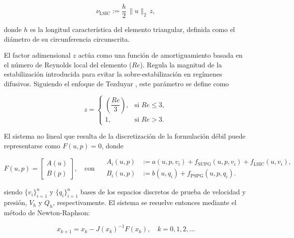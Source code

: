 \documentclass[12pt, letterpaper]{article}
\begin{document}
\begin{equation}
  \label{eq:nu_lsic}
  \nu_{\mathrm{LSIC}} := \frac{h}{2}\,\|u\|_2\,z,
\end{equation}

\noindent donde $h$ es la longitud característica del elemento triangular, definida como el diámetro de su circunferencia circunscrita. 

El factor adimensional $z$ actúa como una función de amortiguamiento basada en el número de Reynolds local del elemento ($Re$). Regula la magnitud de la estabilización introducida para evitar la sobre-estabilización en regímenes difusivos. Siguiendo el enfoque de Tezduyar \cite{tezduyar}, este parámetro se define como

\begin{equation}
  \label{eq:factor_z}
  z =
  \begin{cases}
    \left( \dfrac{Re}{3} \right), & \text{si } Re \leq 3, \\
    1, &  \text{si } Re > 3.
  \end{cases}
\end{equation}

El sistema no lineal que resulta de la discretización de la formulación débil puede representarse como $F(u,p)=0$, donde

\begin{center}
  \begin{equation}
    \label{eq:nonlinear_system}
    F(u, p) =
    \begin{bmatrix}
      A(u) \\
      B(p)
    \end{bmatrix},
    \quad \text{con }
    \quad
    \begin{aligned}
      A_i(u,p) &:= a(u,p, v_i) + f_{\mathrm{SUPG}}(u,p,v_i) + f_{\mathrm{LSIC}}(u, v_i),\\
      B_i(u,p) &:= b(u, q_i) + f_{\mathrm{PSPG}}(u, p, q_i).
    \end{aligned}
  \end{equation}
\end{center}

\noindent siendo $\{v_i\}_{i=1}^n$ y $\{q_i\}_{i=1}^n$ bases de los espacios discretos de prueba de velocidad y presión, $V_h$ y $Q_h$, respectivamente. El sistema se resuelve entonces mediante el método de Newton-Raphson:

\begin{center}
  \begin{equation}
    x_{k+1} = x_k - J(x_k)^{-1}F(x_k), \quad k = 0, 1, 2, \dots
  \end{equation}
\end{center}
\end{document}
